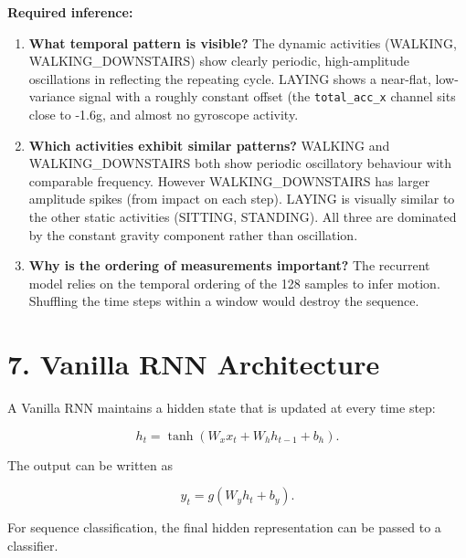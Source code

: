 \documentclass[10pt]{article}
\begin{document}
\textbf{Required inference:}

\begin{enumerate}
\item \textbf{What temporal pattern is visible?} The dynamic activities (WALKING,
WALKING\_DOWNSTAIRS) show clearly periodic, high-amplitude oscillations in
reflecting the repeating cycle. LAYING shows a near-flat, low-variance
signal with a roughly constant offset (the \texttt{total\_acc\_x} channel
sits close to -1.6g, and almost
no gyroscope activity.
\item \textbf{Which activities exhibit similar patterns?} WALKING and
WALKING\_DOWNSTAIRS both show periodic oscillatory behaviour with comparable
frequency. However WALKING\_DOWNSTAIRS has larger amplitude spikes (from
impact on each step). LAYING is visually similar to the other static
activities (SITTING, STANDING). All three are dominated by the
constant gravity component rather than oscillation.
\item \textbf{Why is the ordering of measurements important?} The recurrent
model relies on the temporal ordering of the 128 samples to infer motion. Shuffling the time steps
within a window would destroy the sequence.
\end{enumerate}

\section*{7. Vanilla RNN Architecture}

A Vanilla RNN maintains a hidden state that is updated at every time step:

\[
h_t=\tanh(W_xx_t+W_hh_{t-1}+b_h).
\]

The output can be written as

\[
y_t=g(W_yh_t+b_y).
\]

For sequence classification, the final hidden representation can be passed
to a classifier.

\begin{center}
\end{center}
\end{document}
